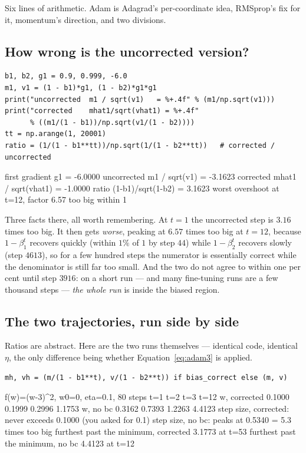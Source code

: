 \documentclass[11pt]{article}
\begin{document}
Six lines of arithmetic. Adam is Adagrad's per-coordinate idea, RMSprop's fix
for it, momentum's direction, and two divisions.

\subsection{How wrong is the uncorrected version?}

\begin{lstlisting}
b1, b2, g1 = 0.9, 0.999, -6.0
m1, v1 = (1 - b1)*g1, (1 - b2)*g1*g1
print("uncorrected  m1 / sqrt(v1)   = %+.4f" % (m1/np.sqrt(v1)))
print("corrected    mhat1/sqrt(vhat1) = %+.4f"
      % ((m1/(1 - b1))/np.sqrt(v1/(1 - b2))))
tt = np.arange(1, 20001)
ratio = (1/(1 - b1**tt))/np.sqrt(1/(1 - b2**tt))   # corrected / uncorrected
\end{lstlisting}
\begin{codeout}
first gradient                g1        = -6.0000
uncorrected  m1 / sqrt(v1)              = -3.1623
corrected    mhat1 / sqrt(vhat1)        = -1.0000
ratio  (1-b1)/sqrt(1-b2)                = 3.1623
worst overshoot at t=12, factor 6.57 too big
within 1%
\end{codeout}

Three facts there, all worth remembering. At $t=1$ the uncorrected step is
$3.16$ times too big. It then gets \emph{worse}, peaking at $6.57$ times too
big at $t=12$, because $1-\beta_1^t$ recovers quickly (within $1\%$ of $1$ by
step $44$) while $1-\beta_2^t$ recovers slowly (step $4613$), so for a few
hundred steps the numerator is essentially correct while the denominator is
still far too small. And the two do not agree to within one per cent until step
$3916$: on a short run --- and many fine-tuning runs are a few thousand steps
--- \emph{the whole run} is inside the biased region.

\subsection{The two trajectories, run side by side}

Ratios are abstract. Here are the two runs themselves --- identical code,
identical $\eta$, the only difference being whether
Equation~\eqref{eq:adam3} is applied.

\begin{lstlisting}
mh, vh = (m/(1 - b1**t), v/(1 - b2**t)) if bias_correct else (m, v)
\end{lstlisting}
\begin{codeout}
f(w)=(w-3)^2, w0=0, eta=0.1, 80 steps
               t=1       t=2       t=3       t=12
w, corrected   0.1000    0.1999    0.2996    1.1753
w, no bc       0.3162    0.7393    1.2263    4.4123
step size, corrected: never exceeds 0.1000  (you asked for 0.1)
step size, no bc:     peaks at      0.5340  = 5.3 times too big
furthest past the minimum, corrected  3.1773 at t=53
furthest past the minimum, no bc      4.4123 at t=12
\end{codeout}
\end{document}
